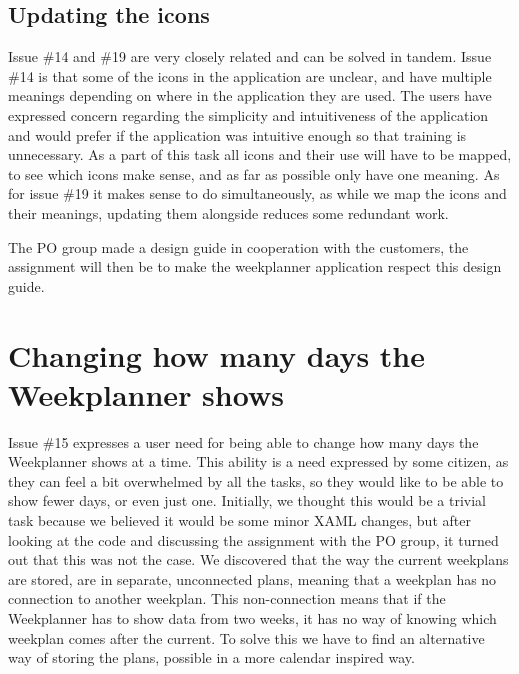 \subsection{Updating the icons}
Issue \#14 and \#19 are very closely related and can be solved in tandem. Issue \#14 is that some of the icons in the application are unclear, and have multiple meanings depending on where in the application they are used. The users have expressed concern regarding the simplicity and intuitiveness of the application and would prefer if the application was intuitive enough so that training is unnecessary.
As a part of this task all icons and their use will have to be mapped, to see which icons make sense, and as far as possible only have one meaning. As for issue \#19 it makes sense to do simultaneously, as while we map the icons and their meanings, updating them alongside reduces some redundant work. 

The \gls{PO} group made a design guide in cooperation with the customers, the assignment will then be to make the weekplanner application respect this design guide.

\section{Changing how many days the Weekplanner shows}\label{sec:weekPlannerDaysToShow}

Issue \#15 expresses a user need for being able to change how many days the Weekplanner shows at a time. This ability is a need expressed by some citizen, as they can feel a bit overwhelmed by all the tasks, so they would like to be able to show fewer days, or even just one.
Initially, we thought this would be a trivial task because we believed it would be some minor \gls{XAML} changes, but after looking at the code and discussing the assignment with the \gls{PO} group, it turned out that this was not the case. We discovered that the way the current weekplans are stored, are in separate, unconnected plans, meaning that a weekplan has no connection to another weekplan. This non-connection means that if the Weekplanner has to show data from two weeks, it has no way of knowing which weekplan comes after the current.
To solve this we have to find an alternative way of storing the plans, possible in a more calendar inspired way.

